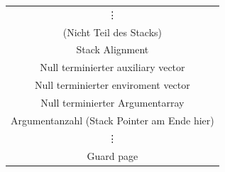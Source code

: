 \documentclass[german]{tum-presentation}
\begin{document}
\begin{frame}[fragile]
\begin{columns}[c, onlytextwidth]
\begin{column}{0.49\textwidth}
			\centering
			\onslide<3->
			\begin{tabular}{|c|}
				\hline
				\rule[-1ex]{0pt}{3ex} \vdots                                      \\
				(Nicht Teil des Stacks)                                               \\
				\hline \hline
				\rule[-1ex]{0pt}{3ex} Stack Alignment                                 \\
				\hline
				\rule[-1ex]{0pt}{3ex} Null terminierter auxiliary vector              \\
				\hline
				\rule[-1ex]{0pt}{3ex} Null terminierter enviroment vector             \\
				\hline
				\rule[-1ex]{0pt}{3ex} Null terminierter Argumentarray                 \\
				\hline
				\rule[-1ex]{0pt}{3ex} Argumentanzahl (Stack Pointer am Ende hier) \\
				\hline
				\rule[-1ex]{0pt}{3ex} \vdots                                          \\
				\hline
				\rule[-1ex]{0pt}{3ex} Guard page                                      \\
				\hline
			\end{tabular}
		\end{column}
	\end{columns}
\end{frame}
\end{document}

